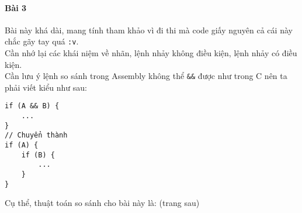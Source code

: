 \documentclass[main.tex]{subfiles}
\begin{document}
\inputminted[linenos,breaklines]{nasm}{answer_source/Bai2.asm}


\paragraph*{Bài 3}
Bài này khá dài, mang tính tham khảo vì đi thi mà code giấy nguyên cả cái này chắc gãy tay quá \verb#:v#.\\
Cần nhớ lại các khái niệm về nhãn, lệnh nhảy không điều kiện, lệnh nhảy có điều kiện.\\
Cần lưu ý lệnh so sánh trong Assembly không thể \verb#&&# được như  trong C nên ta phải viết kiểu như sau:
\begin{verbatim}
if (A && B) {
    ...
}
// Chuyển thành
if (A) {
    if (B) {
        ...
    }
}
\end{verbatim}
Cụ thể, thuật toán so sánh cho bài này là: (trang sau)
\end{document}
